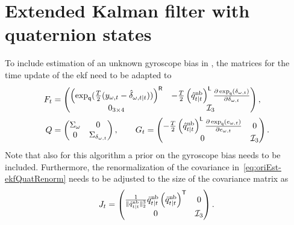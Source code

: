 \section{Extended Kalman filter with quaternion states}
To include estimation of an unknown gyroscope bias in , the matrices for the time update of the \gls{ekf} need to be adapted to
\begin{subequations}
\begin{align}
F_t &= \begin{pmatrix}
\left( \exp_\mathsf{q} (\tfrac{T}{2} (y_{\omega,t} - \hat{\delta}_{\omega,t \mid t})) \right)^{\mathsf{R}} & -\tfrac{T}{2} \left( \hat{q}^\text{nb}_{t \mid t} \right)^{\mathsf{L}} \tfrac{\partial \exp_\mathsf{q} (\delta_{\omega,t})}{\partial \delta_{\omega,t}} \\
0_{3 \times 4} & \mathcal{I}_3
\end{pmatrix}, \\
Q &= \begin{pmatrix} \Sigma_\omega & 0 \\ 0 & \Sigma_{\delta_{\omega,t}} \end{pmatrix}, \qquad G_t = \begin{pmatrix} -\tfrac{T}{2} \left( \hat{q}^\text{nb}_{t \mid t} \right)^{\mathsf{L}} \tfrac{\partial \exp_\mathsf{q} (e_{\omega,t})}{\partial e_{\omega,t}} & 0 \\ 0 & \mathcal{I}_3 \end{pmatrix}.
\end{align}
\end{subequations}
Note that also for this algorithm a prior on the gyroscope bias needs to be included. Furthermore, the renormalization of the covariance in~\eqref{eq:oriEst-ekfQuatRenorm} needs to be adjusted to the size of the covariance matrix as
\begin{align}
    \label{eq:app-estGyroBias-relinCovFiltOpt}
    J_t = \begin{pmatrix} \tfrac{1}{\| \tilde{q}^\text{nb}_{t \mid t} \|_2^3} \tilde{q}^\text{nb}_{t \mid t} \left( \tilde{q}^\text{nb}_{t \mid t} \right)^{\mathsf{T}} & 0 \\ 0 & \mathcal{I}_3 \end{pmatrix}.
\end{align}

